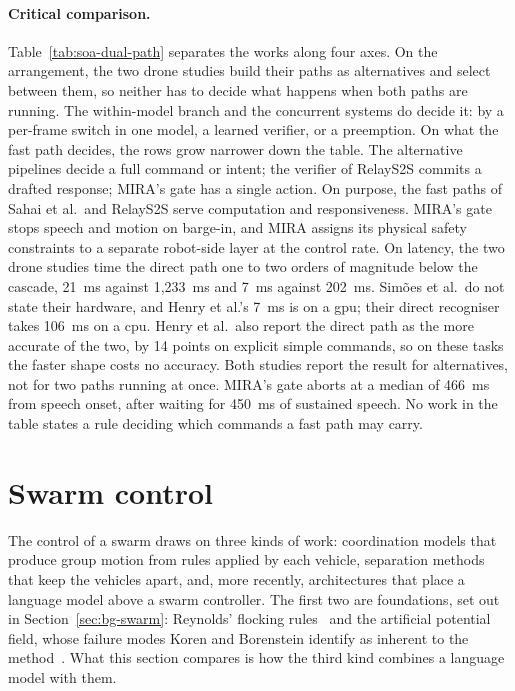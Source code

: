 \paragraph{Critical comparison.} Table~\ref{tab:soa-dual-path} separates the works along four axes.
On the arrangement, the two drone studies build their paths as alternatives and select between them,
so neither has to decide what happens when both paths are running. The within-model branch and the
concurrent systems do decide it: by a per-frame switch in one model, a learned verifier, or a
preemption. On what the fast path decides, the rows grow narrower down the table. The alternative
pipelines decide a full command or intent; the verifier of RelayS2S commits a drafted response;
MIRA's gate has a single action. On purpose, the fast paths of Sahai et al.\ and RelayS2S serve
computation and responsiveness. MIRA's gate stops speech and motion on barge-in, and MIRA assigns
its physical safety constraints to a separate robot-side layer at the control rate. On latency, the
two drone studies time the direct path one to two orders of magnitude below the cascade, 21~ms
against 1{,}233~ms and 7~ms against 202~ms. Sim\~oes et al.\ do not state their hardware, and Henry
et al.'s 7~ms is on a \gls{gpu}; their direct recogniser takes 106~ms on a \gls{cpu}. Henry et al.\
also report the direct path as the more accurate of the two, by 14 points on explicit simple
commands, so on these tasks the faster shape costs no accuracy. Both studies report the result for
alternatives, not for two paths running at once. MIRA's gate aborts at a median of 466~ms from
speech onset, after waiting for 450~ms of sustained speech. No work in the table states a rule
deciding which commands a fast path may carry.

\section{Swarm control}
\label{sec:swarm-control-sota}
The control of a swarm draws on three kinds of work: coordination models that produce group motion
from rules applied by each vehicle, separation methods that keep the vehicles apart, and, more
recently, architectures that place a language model above a swarm controller. The first two are
foundations, set out in Section~\ref{sec:bg-swarm}: Reynolds' flocking rules~\cite{reynolds1987} and
the artificial potential field, whose failure modes Koren and Borenstein identify as inherent to the
method~\cite{koren1991}. What this section compares is how the third kind combines a language model
with them.

